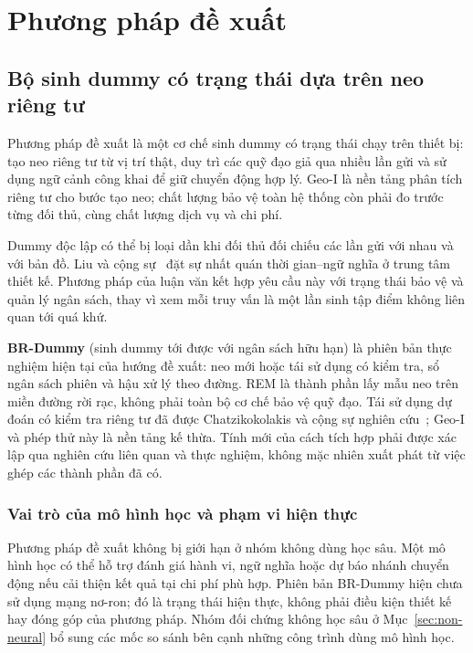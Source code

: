 \chapter{Phương pháp đề xuất}
\label{ch:method}

\section{Bộ sinh dummy có trạng thái dựa trên neo riêng tư}

Phương pháp đề xuất là một cơ chế sinh dummy có trạng thái chạy trên thiết bị: tạo neo riêng tư từ vị trí thật, duy trì các quỹ đạo giả qua nhiều lần gửi và sử dụng ngữ cảnh công khai để giữ chuyển động hợp lý. Geo-I là nền tảng phân tích riêng tư cho bước tạo neo; chất lượng bảo vệ toàn hệ thống còn phải đo trước từng đối thủ, cùng chất lượng dịch vụ và chi phí.

Dummy độc lập có thể bị loại dần khi đối thủ đối chiếu các lần gửi với nhau và với bản đồ. Liu và cộng sự~\cite{liu2026semantic} đặt sự nhất quán thời gian--ngữ nghĩa ở trung tâm thiết kế. Phương pháp của luận văn kết hợp yêu cầu này với trạng thái bảo vệ và quản lý ngân sách, thay vì xem mỗi truy vấn là một lần sinh tập điểm không liên quan tới quá khứ.

\textbf{BR-Dummy} (sinh dummy tới được với ngân sách hữu hạn) là phiên bản thực nghiệm hiện tại của hướng đề xuất: neo mới hoặc tái sử dụng có kiểm tra, sổ ngân sách phiên và hậu xử lý theo đường. REM là thành phần lấy mẫu neo trên miền đường rời rạc, không phải toàn bộ cơ chế bảo vệ quỹ đạo. Tái sử dụng dự đoán có kiểm tra riêng tư đã được Chatzikokolakis và cộng sự nghiên cứu~\cite{chatzikokolakis2014predictive}; Geo-I và phép thử này là nền tảng kế thừa. Tính mới của cách tích hợp phải được xác lập qua nghiên cứu liên quan và thực nghiệm, không mặc nhiên xuất phát từ việc ghép các thành phần đã có.

\subsection{Vai trò của mô hình học và phạm vi hiện thực}

Phương pháp đề xuất không bị giới hạn ở nhóm không dùng học sâu. Một mô hình học có thể hỗ trợ đánh giá hành vi, ngữ nghĩa hoặc dự báo nhánh chuyển động nếu cải thiện kết quả tại chi phí phù hợp. Phiên bản BR-Dummy hiện chưa sử dụng mạng nơ-ron; đó là trạng thái hiện thực, không phải điều kiện thiết kế hay đóng góp của phương pháp. Nhóm đối chứng không học sâu ở Mục~\ref{sec:non-neural} bổ sung các mốc so sánh bên cạnh những công trình dùng mô hình học.

